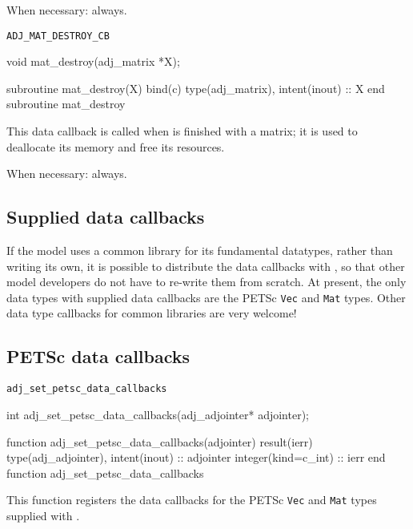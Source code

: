 When necessary: always.
\begin{boxwithtitle}{\texttt{ADJ_MAT_DESTROY_CB}}
\begin{minipage}{\columnwidth}
\begin{ccode}
  void mat_destroy(adj_matrix *X);
\end{ccode}
\begin{fortrancode}
  subroutine mat_destroy(X) bind(c)
    type(adj_matrix), intent(inout) :: X
  end subroutine mat_destroy
\end{fortrancode}
\end{minipage}
\end{boxwithtitle}
This data callback is called when \libadjoint is finished
with a matrix; it is used to deallocate its memory and free
its resources.

When necessary: always.
\subsection{Supplied data callbacks}
If the model uses a common library for its fundamental datatypes, rather than
writing its own, it is possible to distribute the data callbacks with \libadjoint,
so that other model developers do not have to re-write them from scratch. At present, the
only data types with supplied data callbacks are the PETSc \texttt{Vec} and \texttt{Mat} types.
Other data type callbacks for common libraries are very welcome!

\subsection{PETSc data callbacks} \label{sec:petsc_callbacks}
\begin{boxwithtitle}{\texttt{adj_set_petsc_data_callbacks}}
\begin{minipage}{\columnwidth}
\begin{ccode}
  int adj_set_petsc_data_callbacks(adj_adjointer* adjointer);
\end{ccode}
\begin{fortrancode}
  function adj_set_petsc_data_callbacks(adjointer) result(ierr)
    type(adj_adjointer), intent(inout) :: adjointer
    integer(kind=c_int) :: ierr
  end function adj_set_petsc_data_callbacks
\end{fortrancode}
\end{minipage}
\end{boxwithtitle}
This function registers the data callbacks for the PETSc \texttt{Vec} and \texttt{Mat} types
supplied with \libadjoint.

